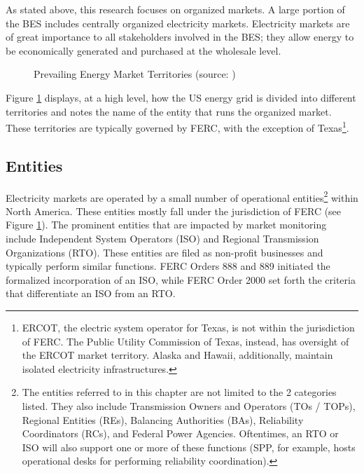 As stated above, this research focuses on organized markets. A large portion of the BES includes centrally organized electricity markets. Electricity markets are of great importance to all stakeholders involved in the BES; they allow energy to be economically generated and purchased at the wholesale level.

\begin{figure}[ht]
\centering
{}
\caption{Prevailing Energy Market Territories (source: \cite{ferc1})}
\label{fig:gridmap}
\end{figure}

Figure \ref{fig:gridmap} displays, at a high level, how the US energy grid is divided into different territories and notes the name of the entity that runs the organized market. These territories are typically governed by FERC, with the exception of Texas\footnote{ERCOT, the electric system operator for Texas, is not within the jurisdiction of FERC. The Public Utility Commission of Texas, instead, has oversight of the ERCOT market territory. Alaska and Hawaii, additionally, maintain isolated electricity infrastructures.}.

\subsection{Entities}
Electricity markets are operated by a small number of operational entities\footnote{The entities referred to in this chapter are not limited to the 2 categories listed. They also include Transmission Owners and Operators (TOs / TOPs), Regional Entities (REs), Balancing Authorities (BAs), Reliability Coordinators (RCs), and Federal Power Agencies. Oftentimes, an RTO or ISO will also support one or more of these functions (SPP, for example, hosts operational desks for performing reliability coordination).}
within North America. These entities mostly fall under the jurisdiction of FERC (see Figure \ref{fig:gridmap}). The prominent entities that are impacted by market monitoring include Independent System Operators (ISO) and Regional Transmission Organizations (RTO). These entities are filed as non-profit businesses and typically perform similar functions. FERC Orders 888 and 889 initiated the formalized incorporation of an ISO, while FERC Order 2000 set forth the criteria that differentiate an ISO from an RTO.


